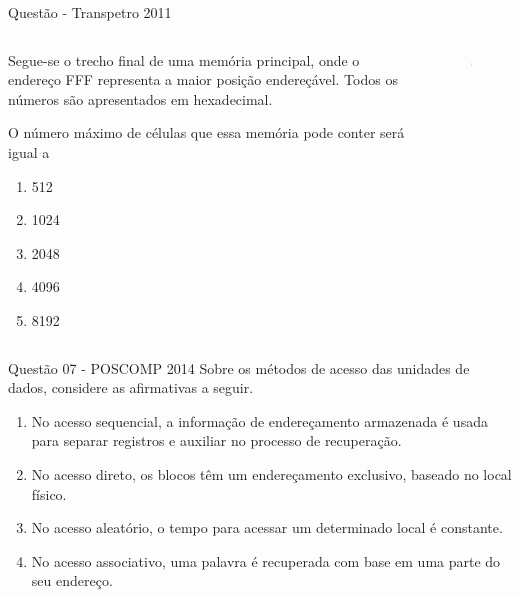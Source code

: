 \documentclass[aspectratio=169,
				xcolor=table]{beamer}
\begin{document}
	\begin{frame}{Questão - Transpetro 2011}		
		\begin{columns}
			\begin{column}{0.65\textwidth}
				Segue-se o trecho final de uma memória principal, onde o endereço FFF representa a maior posição endereçável. Todos os números são apresentados em hexadecimal.
	
				O número máximo de células que essa memória pode conter será igual a
				\begin{enumerate}[a]
					\item	512
					\item	1024
					\item	2048
					\item	4096
					\item	8192			
				\end{enumerate}			
			\end{column}
			\begin{column}{0.35\textwidth}
				\begin{figure}
					\includegraphics[height=0.7\textheight, keepaspectratio]{../figs/cap07/memquestion.png}
				\end{figure}			
			\end{column}
		\end{columns}		
	\end{frame}	
	
	\begin{frame}{Questão 07 - POSCOMP 2014}
		Sobre os métodos de acesso das unidades de dados, considere as afirmativas a seguir.
		\begin{enumerate}[I]
			\large
			\item No acesso sequencial, a informação de endereçamento armazenada é usada para separar registros e auxiliar no processo de recuperação.
			\item No acesso direto, os blocos têm um endereçamento exclusivo, baseado no local físico.
			\item No acesso aleatório, o tempo para acessar um determinado local é constante.
			\item No acesso associativo, uma palavra é recuperada com base em uma parte do seu endereço.
		\end{enumerate}
	\end{frame}	
	
\end{document}
